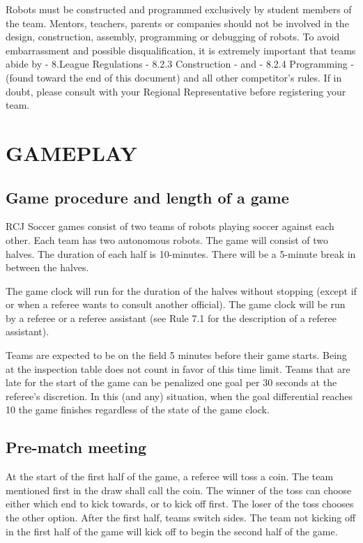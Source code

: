 \documentclass{article}
\begin{document}
Robots must be constructed and programmed exclusively by student members of the
team. Mentors, teachers, parents or companies should not be involved in the
design, construction, assembly, programming or debugging of robots. To avoid
embarrassment and possible disqualification, it is extremely important that
teams abide by - 8.League Regulations - 8.2.3 Construction - and - 8.2.4
Programming - (found toward the end of this document) and all other
competitor's rules. If in doubt, please consult with your Regional
Representative before registering your team.

\newpage

\tableofcontents

\newpage

\section{GAMEPLAY \label{ref-001}}

\subsection{Game procedure and length of a game \label{ref-002}}

RCJ Soccer games consist of two teams of robots playing soccer against
each other. Each team has two autonomous robots. The game will consist of two
halves. The duration of each half is 10-minutes. There will be a 5-minute break
in between the halves.

The game clock will run for the duration of the halves without stopping (except
if or when a referee wants to consult another official). The game clock will be run
by a referee or a referee assistant (see Rule 7.1 for the description of a
referee assistant).

Teams are expected to be on the field 5 minutes before their game
starts. Being at the inspection table does not count in favor of this time
limit. Teams that are late for the start of the game can be penalized one goal per
30 seconds at the referee's discretion. In this (and any) situation, when the goal
differential reaches 10 the game finishes regardless of the state of the game clock.

\subsection{Pre-match meeting \label{ref-003}}

At the start of the first half of the game, a referee will toss a coin. The
team mentioned first in the draw shall call the coin. The winner of the toss
can choose either which end to kick towards, or to kick off first. The loser of the
toss chooses the other option. After the first half, teams switch sides.
The team not kicking off in the first half of the game will kick off to
begin the second half of the game.
\end{document}
